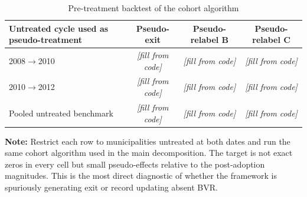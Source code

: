 \begin{table}[!htbp]
\centering
\caption{Pre-treatment backtest of the cohort algorithm}
\label{tab:decomp_placebo}
\begin{tabular}{p{}ccc}
\toprule
Untreated cycle used as pseudo-treatment & Pseudo-exit & Pseudo-relabel B & Pseudo-relabel C \\
\midrule
2008$\rightarrow$2010 & \textit{[fill from code]} & \textit{[fill from code]} & \textit{[fill from code]} \\
2010$\rightarrow$2012 & \textit{[fill from code]} & \textit{[fill from code]} & \textit{[fill from code]} \\
Pooled untreated benchmark & \textit{[fill from code]} & \textit{[fill from code]} & \textit{[fill from code]} \\
\bottomrule
\end{tabular}

\vspace{0.75em}
\begin{minipage}{\textwidth}
{\footnotesize \textbf{Note:} Restrict each row to municipalities untreated at both dates and run the same cohort algorithm used in the main decomposition. The target is not exact zeros in every cell but small pseudo-effects relative to the post-adoption magnitudes. This is the most direct diagnostic of whether the framework is spuriously generating exit or record updating absent BVR. \par}
\end{minipage}
\end{table}

